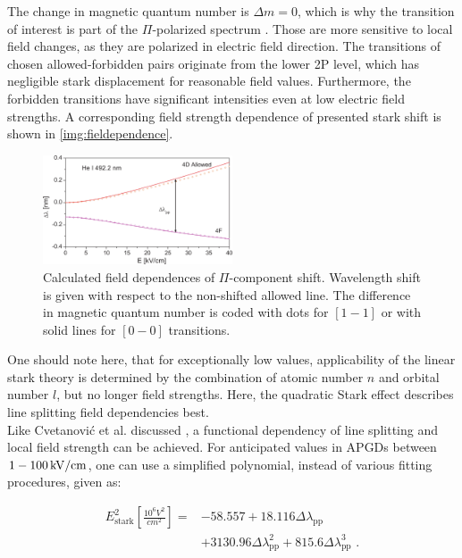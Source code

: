 \documentclass[a4paper,10pt,twoside]{article}
\newcommand{\tenpo}[1]{ 10^{#1}}
\newcommand{\ix}[1]{_\text{#1}}
\begin{document}
		The change in magnetic quantum number is $\Delta m=0$, which is why the transition of interest is part of the $\Pi$-polarized spectrum \cite{starkshiftmeas}. Those are more sensitive to local field changes, as they are polarized in electric field direction. The transitions of chosen allowed-forbidden pairs originate from the lower 2P level, which has negligible stark displacement for reasonable field values. Furthermore, the forbidden transitions have significant intensities even at low electric field strengths. A corresponding field strength dependence of presented stark shift is shown in \autoref{img:fieldependence}.
		
			\begin{figure}[b!]
				\centering
				\includegraphics[width=0.5\textwidth]{figures/stark/starkshiftfielddependence.pdf}
				\caption{Calculated field dependences of $\Pi$-component shift. Wavelength shift is given with respect to the non-shifted allowed line. The difference in magnetic quantum number is coded with dots for $[1-1]$ or with solid lines for $[0-0]$ transitions. \cite{starkshiftmeas}}
				\label{img:fieldependence}
			\end{figure}
		
		One should note here, that for exceptionally low values, applicability of the linear stark theory is determined by the combination of atomic number $n$ and orbital number $l$, but no longer field strengths. Here, the quadratic Stark effect describes line splitting field dependencies best.\\		
		Like Cvetanovi{\'c} et al. discussed \cite{starkshiftmeas}, a functional dependency of line splitting and local field strength can be achieved. For anticipated values in APGDs between $\unit[1-100]{kV/cm}$, one can use a simplified polynomial, instead of various fitting procedures, given as:
		
			\begin{align}
				E\ix{stark}^2\left[\frac{\tenpo{6}V^2}{cm^2}\right]=&-58.557+18.116\Delta\lambda\ix{pp} \nonumber \\
				&+3130.96\Delta\lambda\ix{pp}^2+815.6\Delta\lambda\ix{pp}^3 \,\,.
			\end{align}
		
\end{document}
